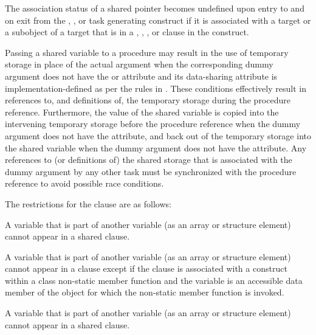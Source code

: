 \begin{fortranspecific}
The association status of a shared pointer becomes undefined upon entry to and on exit
from the , , or task generating construct if it
is associated with a target or a  subobject of a target that is in a ,
, , or  clause in the construct.


\begin{note}
Passing a shared variable to a procedure may result in the use of
temporary storage in place of the actual argument when the corresponding dummy
argument does not have the  or  attribute and its data-sharing attribute
is implementation-defined as per the rules in
.
These conditions effectively result in references to, and definitions of, the
temporary storage during the procedure reference.  Furthermore, the value of
the shared variable is copied into the intervening temporary storage before the procedure
reference when the dummy argument does not have the 
attribute, and back out of the temporary storage into the shared variable when
the dummy argument does not have the  attribute.  Any
references to (or definitions of) the shared storage that is associated with
the dummy argument by any other task must be synchronized with
the procedure reference to avoid possible race conditions.

\end{note}
\medskip
\end{fortranspecific}


\restrictions
The restrictions for the  clause are as follows:
\begin{itemize}
%
\begin{cspecific}
\item A variable that is part of another variable (as an array or structure element) cannot appear in a shared clause.
\end{cspecific}
%
\begin{cppspecific}
\item A variable that is part of another variable (as an array or structure
  element) cannot appear in a  clause except if the 
  clause is associated with a construct within a class non-static member
  function and the variable is an accessible data member of the object for
  which the non-static member function is invoked.
\end{cppspecific}
%
\begin{fortranspecific}
\item A variable that is part of another variable (as an array or structure element) cannot appear in a shared clause.
\end{fortranspecific}
%
\end{itemize}







